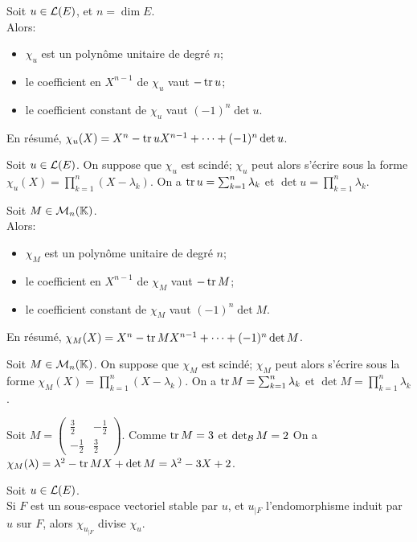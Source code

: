 \documentclass[a4paper]{book}
\begin{document}
\begin{Theoreme}
Soit $u\in \mathcal{L}(E)$, et $n = \dim E$.\\
 Alors:
\begin{itemize}
\item $\chi_u$ est un polynôme unitaire de degré $n$;
\item le coefficient en $X^{n-1}$ de $\chi_u$ vaut $- \operatorname{tr} u$;
\item le coefficient constant de $\chi_u$ vaut $(-1)^n \det u$.
\end{itemize}
En résumé, $\chi_u(X)=X^n- \operatorname{tr} u X^{n-1}+\dots + (-1)^n \mathop{\mathrm{det}}\nolimits u$.
\end{Theoreme}
\begin{Corollaire}
Soit $u\in \mathcal{L}(E)$. On suppose que $\chi_u$ est scindé;
$\chi_u$ peut alors s'écrire sous la forme $\chi_u(X)=\prod_{k=1}^n(X-\lambda_k)$.
On a $\operatorname{tr} u = \sum_{k=1}^n \lambda_k$ et $\det u = \prod_{k=1}^n \lambda_k$.
\end{Corollaire}
\begin{Theoreme}
Soit $M\in \mathcal{M}_{n}(\mathbb{K})$.\\
 Alors:
\begin{itemize}
\item $\chi_M$ est un polynôme unitaire de degré $n$;
\item le coefficient en $X^{n-1}$ de $\chi_M$ vaut $- \operatorname{tr} M$;
\item le coefficient constant de $\chi_M$ vaut $(-1)^n \det M$.
\end{itemize}
En résumé, $\chi_M(X)=X^n- \operatorname{tr} M X^{n-1}+\dots + (-1)^n \mathop{\mathrm{det}}\nolimits M$.
\end{Theoreme}
\begin{Corollaire}
Soit $M\in \mathcal{M}_{n}(\mathbb{K})$. On suppose que $\chi_M$ est scindé;
$\chi_M$ peut alors s'écrire sous la forme $\chi       _M(X)=\prod_{k=1}^n(X-\lambda_k)$.
On a $\operatorname{tr} M = \sum_{k=1}^n \lambda_k$ et $\det M = \prod_{k=1}^n \lambda_k$.
\end{Corollaire}
\begin{Exemple} Soit $M=\begin{pmatrix}\frac 3 2 &-\frac 1 2\\-\frac 1 2&\frac 3 2\end{pmatrix}$.
Comme $\operatorname{tr} M = 3$ et $\mathop{\mathrm{det}}\nolimits_{\mathcal{B}} M=2$ On a $\chi       _M(\lambda    )=\lambda    ^2 - \operatorname{tr} M X+\mathop{\mathrm{det}}\nolimits M= \lambda    ^2 - 3 X+2$.
\end{Exemple}
\begin{Proposition}
Soit $u\in \mathcal{L}(E)$.\\
Si $F$ est un sous-espace vectoriel stable par $u$,
et $u_{|F}$ l'endomorphisme induit par $u$ sur $F$,
alors $\chi_{u_{|F}}$ divise $\chi_u$.
\end{Proposition}
\end{document}

